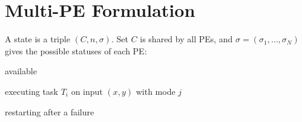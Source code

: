 \section{Multi-PE Formulation}
\label{sec:mdp:multipe}

A state is a triple $(C, n, \sigma)$. Set $C$ is shared by all PEs, and
$\sigma = (\sigma_1, \ldots, \sigma_N)$ gives the possible statuses of each PE:
\begin{compactitem}
\item available
\item executing task $T_i$ on input $(x,y)$ with mode $j$
\item restarting after a failure
\end{compactitem}